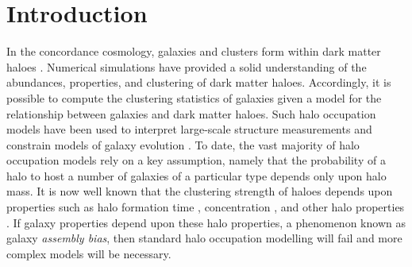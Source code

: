 \documentclass[usenatbib,fleqn]{mnras}
\begin{document}


\section{Introduction}
\label{section:introduction}

In the concordance cosmology, galaxies and clusters form within dark matter haloes \citep{white_rees78,blumenthal_etal84, mo_etal10}. Numerical simulations have provided a solid understanding of the abundances, properties, and clustering of dark matter haloes. Accordingly, it is possible to compute the clustering statistics of galaxies given a model for the relationship between galaxies and dark matter haloes. Such halo occupation models have been used to interpret large-scale structure measurements and constrain models of galaxy evolution \citep{yang_etal03,tinker_etal05,zehavi_etal05b,porciani_norberg06,vdbosch_etal07,zheng_etal07,conroy_wechsler09,yang_etal09b,zehavi_etal11,guo_etal11a,wake_etal11,yang_etal11a,yang_etal12,leauthaud_etal12,rodriguezpuebla_etal12, behroozi_etal13b, moster_etal13, tinker_etal13,cacciato_etal13,more_etal13,guo_etal14,zu_mandelbaum15b}. To date, the vast majority of halo occupation models rely on a key assumption, namely that the probability of a halo to host a number of galaxies of a particular type depends only upon halo mass. It is now well known that the clustering strength of haloes depends upon properties such as halo formation time \citep{gao_etal05,harker_etal06,wechsler_etal06,gao_white07,croton_etal07,zentner07,dalal_etal08, li_etal08, lacerna_padilla11}, concentration \citep{wechsler_etal06,faltenbacher_white10}, and other halo properties \citep{bett_etal07, hahn_etal07a, hahn_etal07b, hahn_etal09, faltenbacher_white10, hester_tasitsiomi10, lacerna_padilla12, vandaalen_etal12, fisher_faltenbacher16, sunayama_etal16, chavesmontero_etal16}. If galaxy properties depend upon these halo properties, a phenomenon known as galaxy {\em assembly bias}, then standard halo occupation modelling will fail \citep{zentner_etal14} and more complex models \citep{gilmarin_etal11, hearin_etal16} will be necessary.
\end{document}
